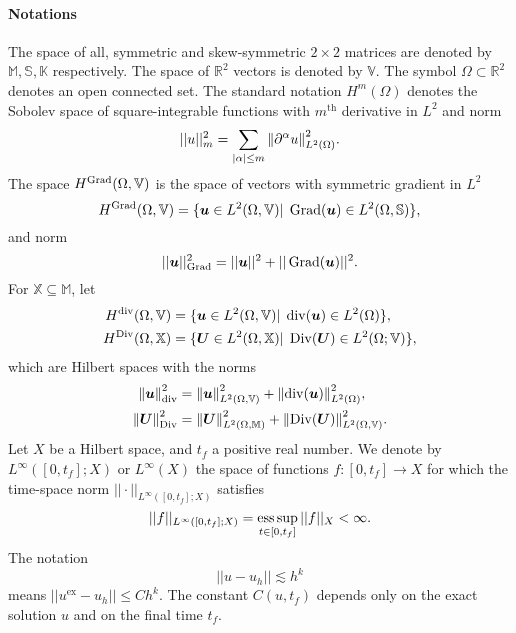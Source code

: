 \paragraph{Notations}
The space of all, symmetric and skew-symmetric $2\times 2$ matrices are denoted by $\mathbb{M}, \mathbb{S}, \mathbb{K}$ respectively. The space of $\mathbb{R}^2$ vectors is denoted by $\mathbb{V}$. The symbol $\Omega \subset \mathbb{R}^2$ denotes an open connected set. The standard notation $H^m(\Omega)$ denotes the Sobolev space of square-integrable functions with  $m^\text{th}$ derivative in $L^2$ and norm 
\begin{equation*}
||u||_m^2 = {\sum_{|\alpha|\le m} \left\|\partial^\alpha u\right\|_{L^2(\Omega)}^2}.
\end{equation*}
The space $H^{\operatorname*{Grad}}(\Omega, \mathbb{V})$ is the space of vectors with symmetric gradient in $L^2$
\begin{equation*}
H^{\operatorname*{Grad}}(\Omega, \mathbb{V}) = \{\bm{u} \in L^2(\Omega, \mathbb{V}) \vert \; \operatorname*{Grad}(\bm{u}) \in L^2(\Omega, \mathbb{S}) \},
\end{equation*}
and norm 
\begin{equation*}
||\bm{u}||_{\operatorname*{Grad}}^2 = {||\bm{u}||^2 + ||\operatorname*{Grad}(\bm{u})||^2}.
\end{equation*}
For $\mathbb{X} \subseteq \mathbb{M}$, let
\begin{equation*}
\begin{aligned}
H^{\operatorname{div}}(\Omega, \mathbb{V}) &= \{\bm{u} \in L^2(\Omega, \mathbb{V}) \vert \; \operatorname{div}(\bm{u}) \in L^2(\Omega) \}, \\
H^{\operatorname*{Div}}(\Omega, \mathbb{X}) &= \{\bm{U} \in L^2(\Omega, \mathbb{X}) \vert \; \operatorname*{Div}(\bm{U}) \in L^2(\Omega; \mathbb{V}) \},
\end{aligned}
\end{equation*}
which are Hilbert spaces with the norms 
\begin{align*}
\left\|\bm{u}\right\|_{\operatorname{div}}^2 &= {\left\|\bm{u}\right\|_{L^2(\Omega, \mathbb{V})}^2 + \left\|\operatorname{div}(\bm{u})\right\|_{L^2(\Omega)}^2}, \\
\left\|\bm{U}\right\|_{\operatorname*{Div}}^2 &= {\left\|\bm{U}\right\|_{L^2(\Omega, \mathbb{M})}^2 + \left\|\operatorname*{Div}(\bm{U})\right\|_{L^2(\Omega, \mathbb{V})}^2}.
\end{align*}
Let ${X}$ be a Hilbert space, and $t_f$ a positive real number. We denote by $L^\infty([0, t_f]; {X})$ or $L^\infty({X})$ the space of functions $f: [0, t_f] \rightarrow X$ for which the time-space norm $||\cdot||_{L^\infty([0, t_f]; {X})}$ satisfies
\[
||f||_{L^\infty([0, t_f]; {X})} = \operatorname*{ess\,sup}_{t \in [0,t_f]} ||f||_{{X}} < \infty.
\]
The notation
$$||u - u_h || \lesssim  h^k$$
means $||u^\text{ex} - u_h|| \le C h^k$. The constant $C(u, t_f)$ depends only on the exact solution $u$ and on the final time $t_f$.

